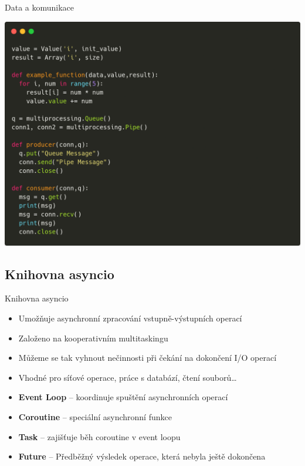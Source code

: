\documentclass{beamer}
\begin{document}
\begin{frame}[fragile]{Data a komunikace}
    \scriptsize
    \begin{center}
        \includegraphics[width=\textwidth]{obrazky/codes/carbon8.png}
    \end{center}
\end{frame}

\subsection{Knihovna asyncio}
\begin{frame}{Knihovna asyncio}
    \begin{itemize}
        \item Umožňuje asynchronní zpracování vstupně-výstupních operací
        \item Založeno na kooperativním multitaskingu
        \item Můžeme se tak vyhnout nečinnosti při čekání na dokončení I/O operací
        \item Vhodné pro síťové operace, práce s databází, čtení souborů…
        
        \vskip 0.35in
        \item \textbf{Event Loop} – koordinuje spuštění asynchronních operací
        \item \textbf{Coroutine} – speciální asynchronní funkce
        \item \textbf{Task} – zajišťuje běh coroutine v event loopu
        \item \textbf{Future} – Předběžný výsledek operace, která nebyla ještě dokončena
    \end{itemize}
\end{frame}
\end{document}
